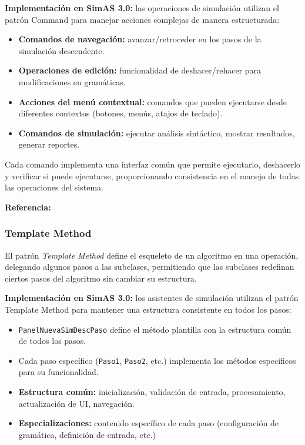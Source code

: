 \textbf{Implementación en SimAS 3.0:} las operaciones de simulación utilizan el patrón Command para manejar acciones complejas de manera estructurada:

\begin{itemize}
    \item \textbf{Comandos de navegación:} avanzar/retroceder en los pasos de la simulación descendente.
    \item \textbf{Operaciones de edición:} funcionalidad de deshacer/rehacer para modificaciones en gramáticas.
    \item \textbf{Acciones del menú contextual:} comandos que pueden ejecutarse desde diferentes contextos (botones, menús, atajos de teclado).
    \item \textbf{Comandos de simulación:} ejecutar análisis sintáctico, mostrar resultados, generar reportes.
\end{itemize}

Cada comando implementa una interfaz común que permite ejecutarlo, deshacerlo y verificar si puede ejecutarse, proporcionando consistencia en el manejo de todas las operaciones del sistema.

\textbf{Referencia:} \cite[pp. 233-242]{gamma1994design}

\subsubsection{Template Method}

El patrón \textit{Template Method} define el esqueleto de un algoritmo en una operación, delegando algunos pasos a las subclases, permitiendo que las subclases redefinan ciertos pasos del algoritmo sin cambiar su estructura.

\textbf{Implementación en SimAS 3.0:} los asistentes de simulación utilizan el patrón Template Method para mantener una estructura consistente en todos los pasos:

\begin{itemize}
    \item \texttt{PanelNuevaSimDescPaso} define el método plantilla con la estructura común de todos los pasos.
    \item Cada paso específico (\texttt{Paso1}, \texttt{Paso2}, etc.) implementa los métodos específicos para su funcionalidad.
    \item \textbf{Estructura común:} inicialización, validación de entrada, procesamiento, actualización de UI, navegación.
    \item \textbf{Especializaciones:} contenido específico de cada paso (configuración de gramática, definición de entrada, etc.)
\end{itemize}

